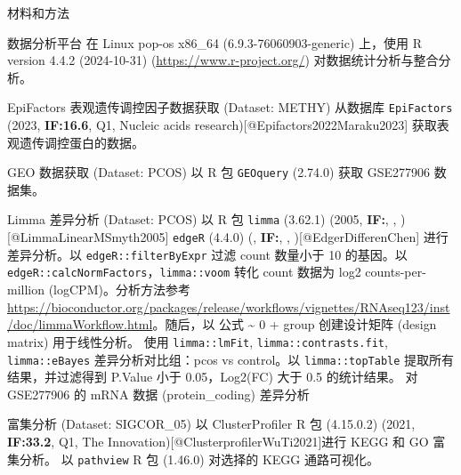 \documentclass[
  ignorenonframetext,
]{beamer}
\begin{document}
\begin{frame}[fragile]{材料和方法}
\protect\hypertarget{introduction}{}
\begin{block}{数据分析平台}
\protect\hypertarget{ux6570ux636eux5206ux6790ux5e73ux53f0}{}
在 Linux pop-os x86\_64 (6.9.3-76060903-generic) 上，使用 R version
4.4.2 (2024-10-31) (\url{https://www.r-project.org/})
对数据统计分析与整合分析。
\end{block}

\begin{block}{EpiFactors 表观遗传调控因子数据获取 (Dataset: METHY)}
\protect\hypertarget{epifactors-ux8868ux89c2ux9057ux4f20ux8c03ux63a7ux56e0ux5b50ux6570ux636eux83b7ux53d6-dataset-methy}{}
从数据库 \texttt{EpiFactors} (2023, \textbf{IF:16.6}, Q1, Nucleic acids
research){[}@Epifactors2022Maraku2023{]} 获取表观遗传调控蛋白的数据。
\end{block}

\begin{block}{GEO 数据获取 (Dataset: PCOS)}
\protect\hypertarget{geo-ux6570ux636eux83b7ux53d6-dataset-pcos}{}
以 R 包 \texttt{GEOquery} (2.74.0) 获取 GSE277906 数据集。
\end{block}

\begin{block}{Limma 差异分析 (Dataset: PCOS)}
\protect\hypertarget{limma-ux5deeux5f02ux5206ux6790-dataset-pcos}{}
以 R 包 \texttt{limma} (3.62.1) (2005, \textbf{IF:}, ,
){[}@LimmaLinearMSmyth2005{]} \texttt{edgeR} (4.4.0) (, \textbf{IF:}, ,
){[}@EdgerDifferenChen{]} 进行差异分析。以 \texttt{edgeR::filterByExpr}
过滤 count 数量小于 10 的基因。以
\texttt{edgeR::calcNormFactors}，\texttt{limma::voom} 转化 count 数据为
log2 counts-per-million (logCPM)。分析方法参考
\url{https://bioconductor.org/packages/release/workflows/vignettes/RNAseq123/inst/doc/limmaWorkflow.html}。随后，以
公式 \textasciitilde{} 0 + group 创建设计矩阵 (design matrix)
用于线性分析。 使用 \texttt{limma::lmFit},
\texttt{limma::contrasts.fit}, \texttt{limma::eBayes}
差异分析对比组：pcos vs control。以 \texttt{limma::topTable}
提取所有结果，并过滤得到 P.Value 小于 0.05，\textbar Log2(FC)\textbar{}
大于 0.5 的统计结果。 对 GSE277906 的 mRNA 数据 (protein\_coding)
差异分析
\end{block}

\begin{block}{富集分析 (Dataset: SIGCOR\_05)}
\protect\hypertarget{ux5bccux96c6ux5206ux6790-dataset-sigcor_05}{}
以 ClusterProfiler R 包 (4.15.0.2) (2021, \textbf{IF:33.2}, Q1, The
Innovation){[}@ClusterprofilerWuTi2021{]}进行 KEGG 和 GO 富集分析。 以
\texttt{pathview} R 包 (1.46.0) 对选择的 KEGG 通路可视化。
\end{block}
\end{frame}
\end{document}
